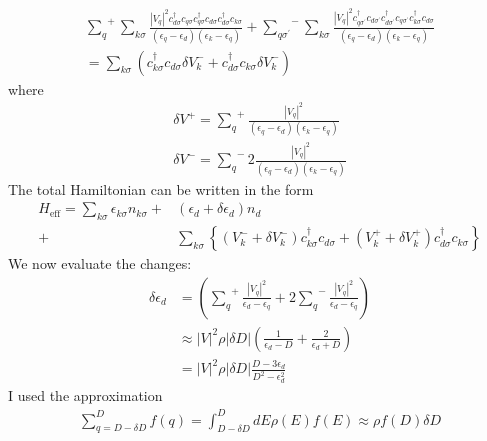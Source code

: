 \documentclass[twoside]{report}
\numberwithin{equation}{section}
\begin{document}
\begin{equation}\begin{aligned}
{\sum_{q}}^+\sum_{k\sigma} \frac{|V_q|^2c^\dagger_{d\sigma}c_{q\sigma}c^\dagger_{q\sigma}c_{d\sigma}c^\dagger_{d\sigma}c_{k\sigma}}{(\epsilon_q - \epsilon_d)(\epsilon_k - \epsilon_q)} + {\sum_{q\sigma^\prime}}^-\sum_{k\sigma} \frac{|V_q|^2c^\dagger_{q\sigma^\prime}c_{d\sigma^\prime}c^\dagger_{d\sigma^\prime}c_{q\sigma^\prime}c^\dagger_{k\sigma}c_{d\sigma}}{(\epsilon_q - \epsilon_d)(\epsilon_k - \epsilon_q)}\\
=\sum_{k\sigma}\left(c^\dagger_{k\sigma}c_{d\sigma} \delta V^-_k + c^\dagger_{d\sigma}c_{k\sigma}\delta V^-_k\right)
\end{aligned}\end{equation}
where
\begin{equation}\begin{aligned}
\delta V^+ = {\sum_q}^+ \frac{|V_q|^2}{(\epsilon_q - \epsilon_d)(\epsilon_k - \epsilon_q)}\\
\delta V^- = {\sum_q}^- 2\frac{|V_q|^2}{(\epsilon_q - \epsilon_d)(\epsilon_k - \epsilon_q)}
\end{aligned}\end{equation}
The total Hamiltonian can be written in the form
\begin{equation}\begin{aligned}
	H_\text{eff} = \sum_{k\sigma}\epsilon_{k\sigma} n_{k\sigma} + &\left(\epsilon_d + \delta \epsilon_d\right)n_d \\
	+ &\sum_{k\sigma}\left\{\left(V^-_k + \delta V^-_k\right) c^\dagger_{k\sigma}c_{d\sigma} + \left(V^+_k + \delta V^+_k\right) c^\dagger_{d\sigma}c_{k\sigma}\right\}
					     \end{aligned}\end{equation}
We now evaluate the changes:
\begin{equation}\begin{aligned}
	\delta \epsilon_d &= \left({\sum_q}^+\frac{|V_q|^2 }{\epsilon_d - \epsilon_q} + 2{\sum_q}^-\frac{|V_q|^2}{\epsilon_d - \epsilon_q}\right) \\
			  &\approx |V|^2 \rho |\delta D| \left(\frac{1}{\epsilon_d - D} + \frac{2}{\epsilon_d + D}\right)\\
&=|V|^2 \rho |\delta D|\frac{D - 3\epsilon_d}{D^2 - \epsilon_d^2}
\end{aligned}\end{equation}
I used the approximation
\begin{equation}\begin{aligned}
\sum_{q=D-\delta D}^D f(q) = \int_{D- \delta D}^D dE \rho(E) f(E) \approx \rho f(D) \delta D
\end{aligned}\end{equation}
\end{document}
